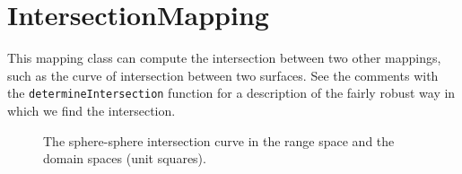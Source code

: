 \section{IntersectionMapping}

This mapping class can compute the intersection between two other mappings, such as the
curve of intersection between two surfaces. See the comments with the {\tt determineIntersection}
function for a description of the fairly robust way in which we find the intersection.


\begin{figure}[hbt]
\newcommand{\figWidth}{8cm}
\newcommand{\trimfig}[2]{\trimFig{#1}{#2}{0.0}{.0}{.1}{.1}}
\newcommand{\figWidtha}{6cm}
\newcommand{\trimfiga}[2]{\trimFig{#1}{#2}{0.075}{.1}{.325}{.35}}
\begin{center}\small
 \caption{The sphere-sphere intersection curve in the range space and the domain spaces (unit squares).}
\end{center}
\end{figure}




